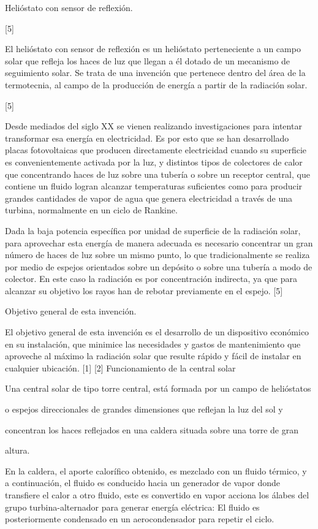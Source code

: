 \documentclass[12pt]{article}
\begin{document}
Helióstato con sensor de reflexión.

[5]

El helióstato con sensor de reflexión es un helióstato perteneciente a un campo solar que refleja los haces de luz que llegan a él dotado de un mecanismo de seguimiento solar. Se trata de una invención que pertenece dentro del área de la termotecnia, al campo de la producción de energía a partir de la radiación solar.

[5]

Desde mediados del siglo XX se vienen realizando investigaciones para intentar transformar esa energía en electricidad. Es por esto que se han desarrollado placas fotovoltaicas que producen directamente electricidad cuando su superficie es convenientemente activada por la luz, y distintos tipos de colectores de calor que concentrando haces de luz sobre una tubería o sobre un receptor central, que contiene un fluido logran alcanzar temperaturas suficientes como para producir grandes cantidades de vapor de agua que genera electricidad a través de una turbina, normalmente en un ciclo de Rankine.

Dada la baja potencia específica por unidad de superficie de la radiación solar, para aprovechar esta energía de manera adecuada es necesario concentrar un gran número de haces de luz sobre un mismo punto, lo que tradicionalmente se realiza por medio de espejos orientados sobre un depósito o sobre una tubería a modo de colector. En este caso la radiación es por concentración indirecta, ya que para alcanzar su objetivo los rayos han de rebotar previamente en el espejo. [5]

Objetivo general de esta invención.

El objetivo general de esta invención es el desarrollo de un dispositivo económico en su instalación, que minimice las necesidades y gastos de mantenimiento que aproveche al máximo la radiación solar que resulte rápido y fácil de instalar en cualquier ubicación. [1] [2]
Funcionamiento de la central solar

Una central solar de tipo torre central, está formada por un campo de helióstatos 

o espejos direccionales de grandes dimensiones que reflejan la luz del sol y

concentran los haces reflejados en una caldera situada sobre una torre de gran 

altura.



En la caldera, el aporte calorífico obtenido, es mezclado con un fluido térmico, y 
a continuación, el fluido es conducido hacia un generador de vapor donde 
transfiere el calor a otro fluido, este es convertido en vapor acciona los álabes del
grupo turbina-alternador para generar energía eléctrica: El fluido es
posteriormente condensado en un aerocondensador para repetir el ciclo.
\end{document}
